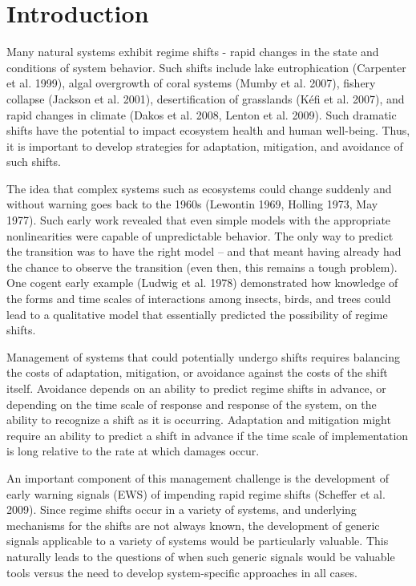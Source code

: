 \documentclass{article}
\begin{document}
\section{Introduction}

Many natural systems exhibit regime shifts - rapid changes in the state
and conditions of system behavior. Such shifts include lake
eutrophication (Carpenter et al. 1999), algal overgrowth of coral
systems (Mumby et al. 2007), fishery collapse (Jackson et al. 2001),
desertification of grasslands (Kéfi et al. 2007), and rapid changes in
climate (Dakos et al. 2008, Lenton et al. 2009). Such dramatic shifts
have the potential to impact ecosystem health and human well-being.
Thus, it is important to develop strategies for adaptation, mitigation,
and avoidance of such shifts.

The idea that complex systems such as ecosystems could change suddenly
and without warning goes back to the 1960s (Lewontin 1969, Holling 1973,
May 1977). Such early work revealed that even simple models with the
appropriate nonlinearities were capable of unpredictable behavior. The
only way to predict the transition was to have the right model -- and
that meant having already had the chance to observe the transition (even
then, this remains a tough problem). One cogent early example (Ludwig et
al. 1978) demonstrated how knowledge of the forms and time scales of
interactions among insects, birds, and trees could lead to a qualitative
model that essentially predicted the possibility of regime shifts.

Management of systems that could potentially undergo shifts requires
balancing the costs of adaptation, mitigation, or avoidance against the
costs of the shift itself. Avoidance depends on an ability to predict
regime shifts in advance, or depending on the time scale of response and
response of the system, on the ability to recognize a shift as it is
occurring. Adaptation and mitigation might require an ability to predict
a shift in advance if the time scale of implementation is long relative
to the rate at which damages occur.

An important component of this management challenge is the development
of early warning signals (EWS) of impending rapid regime shifts
(Scheffer et al. 2009). Since regime shifts occur in a variety of
systems, and underlying mechanisms for the shifts are not always known,
the development of generic signals applicable to a variety of systems
would be particularly valuable. This naturally leads to the questions of
when such generic signals would be valuable tools versus the need to
develop system-specific approaches in all cases.
\end{document}
